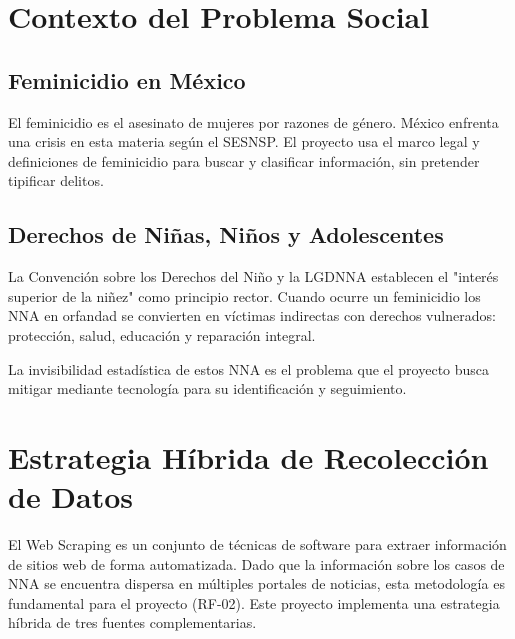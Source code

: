 
\section{Contexto del Problema Social}
\label{sec:contexto_social}

\subsection{Feminicidio en México}
\label{subsec:feminicidio}
El feminicidio es el asesinato de mujeres por razones de género. México enfrenta una crisis en esta materia según el SESNSP. El proyecto usa el marco legal y definiciones de feminicidio para buscar y clasificar información, sin pretender tipificar delitos.

\subsection{Derechos de Niñas, Niños y Adolescentes}
\label{subsec:derechos_nna}
La Convención sobre los Derechos del Niño y la LGDNNA establecen el "interés superior de la niñez" como principio rector. Cuando ocurre un feminicidio los NNA en orfandad se convierten en víctimas indirectas con derechos vulnerados: protección, salud, educación y reparación integral.

La invisibilidad estadística de estos NNA es el problema que el proyecto busca mitigar mediante tecnología para su identificación y seguimiento.

\section{Estrategia Híbrida de Recolección de Datos}
\label{sec:web_scraping}

El Web Scraping es un conjunto de técnicas de software para extraer información de sitios web de forma automatizada. Dado que la información sobre los casos de NNA se encuentra dispersa en múltiples portales de noticias, esta metodología es fundamental para el proyecto (RF-02). Este proyecto implementa una estrategia híbrida de tres fuentes complementarias.

